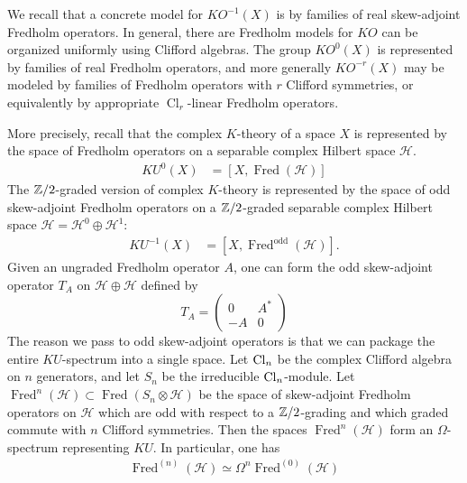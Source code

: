 \documentclass[12pt]{article}
\begin{document}
\begin{remark}
    We recall that a concrete model for $KO^{-1}(X)$ is by families of real skew-adjoint Fredholm operators. In general, there are Fredholm models for $KO$ can be organized uniformly using Clifford algebras. The group $KO^0(X)$ is represented by families of real Fredholm operators, and more generally $KO^{-r}(X)$ may be modeled by families of Fredholm operators with $r$ Clifford symmetries, or equivalently by appropriate $\operatorname{Cl}_r$-linear Fredholm operators.

    More precisely, recall that the complex $K$-theory of a space $X$ is represented by the space of Fredholm operators on a separable complex Hilbert space $\mathcal H$. \begin{align*}
        KU^0(X) & =[X,\operatorname{Fred}(\mathcal H)]
    \end{align*}
    The $\mathbb{Z}/2$-graded version of complex $K$-theory is represented by the space of odd skew-adjoint Fredholm operators on a $\mathbb{Z}/2$-graded separable complex Hilbert space $\mathcal H=\mathcal H^0\oplus \mathcal H^1$:
    \begin{align*}
        KU^{-1}(X) & =[X,\operatorname{Fred}^{\mathrm{odd}}(\mathcal H)].
    \end{align*} Given an ungraded Fredholm operator $A$, one can form the odd skew-adjoint operator $T_A$ on $\mathcal H\oplus \mathcal H$ defined by
    \[
        T_A=\begin{pmatrix}
            0  & A^* \\
            -A & 0
        \end{pmatrix}
    \]
    The reason we pass to odd skew-adjoint operators is that we can package the entire $KU$-spectrum into a single space. Let $\operatorname{Cl}_n$ be the complex Clifford algebra on $n$ generators, and let $S_n$ be the irreducible $\operatorname{Cl}_n$-module. Let $\operatorname{Fred}^n(\mathcal H)
        \subset
        \operatorname{Fred}(S_n\otimes \mathcal H)$ be the space of skew-adjoint Fredholm operators on $\mathcal H$ which are odd with respect to a $\mathbb{Z}/2$-grading and which graded commute with $n$ Clifford symmetries. Then the spaces $\operatorname{Fred}^n(\mathcal H)$ form an $\Omega$-spectrum representing $KU$. In particular, one has
    \begin{align*}
        \operatorname{Fred}^{(n)}(\mathcal H)
        \simeq
        \Omega^n\operatorname{Fred}^{(0)}(\mathcal H)
    \end{align*}
\end{remark}
\end{document}
